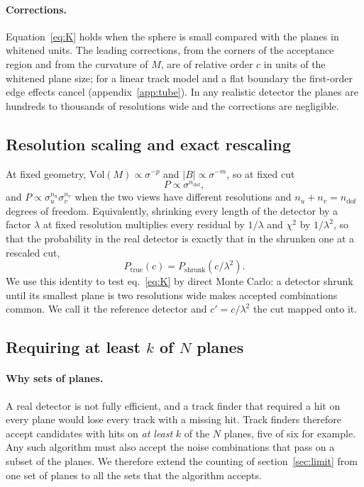 \IfFileExists{jinst.cls}{\documentclass[a4paper,11pt]{jinst}}
\newcommand{\ndof}{n_\mathrm{dof}}
\newcommand{\Vol}{\mathrm{Vol}}
\begin{document}
\paragraph{Corrections.} Equation~\eqref{eq:K} holds when the sphere is small compared with the
planes in whitened units. The leading corrections, from the corners of the acceptance region
and from the curvature of $M$, are of relative order $c$ in units of the whitened plane size;
for a linear track model and a flat boundary the first-order edge effects cancel
(appendix~\ref{app:tube}). In any realistic detector the planes are hundreds to thousands of
resolutions wide and the corrections are negligible.

\subsection{Resolution scaling and exact rescaling}\label{sec:scaling}

At fixed geometry, $\Vol(M)\propto\sigma^{-p}$ and $|B|\propto\sigma^{-m}$, so at fixed cut
\begin{equation}
  P\propto\sigma^{\ndof},
  \label{eq:sigma}
\end{equation}
and $P\propto\sigma_u^{n_u}\sigma_v^{n_v}$ when the two views have different resolutions and
$n_u+n_v=\ndof$ degrees of freedom. Equivalently, shrinking every length of the detector by a
factor $\lambda$ at fixed resolution multiplies every residual by $1/\lambda$ and $\chi^2$ by
$1/\lambda^2$, so that the probability in the real detector is exactly that in the shrunken one
at a rescaled cut,
\begin{equation}
  P_\mathrm{true}(c)=P_\mathrm{shrunk}(c/\lambda^2).
  \label{eq:rescale}
\end{equation}
We use this identity to test eq.~\eqref{eq:K} by direct Monte Carlo: a detector shrunk until
its smallest plane is two resolutions wide makes accepted combinations common. We call it the
reference detector and $c'=c/\lambda^2$ the cut mapped onto it.

\subsection{Requiring at least $k$ of $N$ planes}\label{sec:kofn}

\paragraph{Why sets of planes.} A real detector is not fully efficient, and a track finder
that required a hit on every plane would lose every track with a missing hit. Track finders
therefore accept candidates with hits on \emph{at least} $k$ of the $N$ planes, five of six
for example. Any such algorithm must also accept the noise combinations that pass on a subset
of the planes. We therefore extend the counting of section~\ref{sec:limit} from one set of planes to all
the sets that the algorithm accepts.
\end{document}
